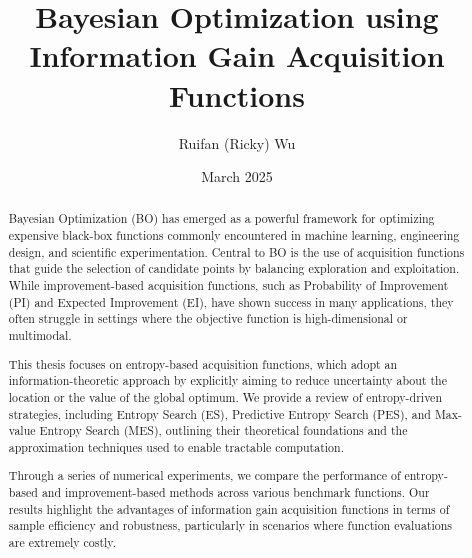 \documentclass{ut-thesis}
\title{Bayesian Optimization using Information Gain Acquisition Functions}
\author{Ruifan (Ricky) Wu}
\date{March 2025}
\begin{document}
\maketitle

\begin{abstract}
Bayesian Optimization (BO) has emerged as a powerful framework for optimizing expensive black-box functions commonly encountered in machine learning, engineering design, and scientific experimentation. Central to BO is the use of acquisition functions that guide the selection of candidate points by balancing exploration and exploitation. While improvement-based acquisition functions, such as Probability of Improvement (PI) and Expected Improvement (EI), have shown success in many applications, they often struggle in settings where the objective function is high-dimensional or multimodal.

This thesis focuses on entropy-based acquisition functions, which adopt an information-theoretic approach by explicitly aiming to reduce uncertainty about the location or the value of the global optimum. We provide a review of entropy-driven strategies, including Entropy Search (ES), Predictive Entropy Search (PES), and Max-value Entropy Search (MES), outlining their theoretical foundations and the approximation techniques used to enable tractable computation.

Through a series of numerical experiments, we compare the performance of entropy-based and improvement-based methods across various benchmark functions. Our results highlight the advantages of information gain acquisition functions in terms of sample efficiency and robustness, particularly in scenarios where function evaluations are extremely costly. 
\end{abstract}
\end{document}
